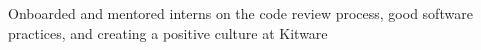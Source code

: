 \documentclass[]{resume-formatting}
\begin{document}
\begin{minipage}[t]{0.7\textwidth}
\begin{tightemize}
\item Onboarded and mentored interns on the code review process, good software practices, and creating a positive culture at Kitware
\end{tightemize}
\sectionsep








\end{minipage}
\end{document}
